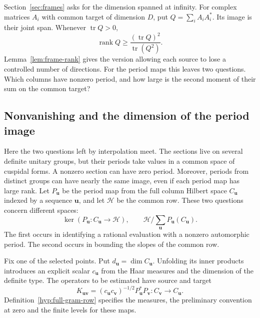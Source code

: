 Section~\ref{sec:frames} asks for the dimension spanned at infinity. For complex matrices \(A_i\) with common target of dimension \(D\), put \(Q=\sum_i A_iA_i^*\). Its image is their joint span. Whenever \(\operatorname{tr}Q>0\),
\[
                 \operatorname{rank}Q
                       \ge\frac{(\operatorname{tr}Q)^2}
                                {\operatorname{tr}(Q^2)} .
\]
Lemma~\ref{lem:frame-rank} gives the version allowing each source to lose a controlled number of directions. For the period maps this leaves two questions. Which columns have nonzero period, and how large is the second moment of their sum on the common target?

\subsection{Nonvanishing and the dimension of the period image}

Here the two questions left by interpolation meet. The sections live on several
definite unitary groups, but their periods take values in a common space of cuspidal
forms. A nonzero section can have zero period. Moreover, periods from distinct groups can have nearly the same image, even if each period map has large rank. Let \(P_{\mathbf u}\) be the period map from the full column Hilbert space \(C_{\mathbf u}\) indexed by a sequence \(\mathbf u\), and let \(\mathcal H\) be the common row. These two questions concern different spaces:
\[
             \ker(P_{\mathbf u}:C_{\mathbf u}\longrightarrow\mathcal H),\qquad
             \mathcal H\Big/\sum_{\mathbf u} P_{\mathbf u}(C_{\mathbf u}).
\]
The first occurs in identifying a rational evaluation with a nonzero automorphic period. The second occurs in bounding the slopes of the common row.

Fix one of the selected points. Put \(d_{\mathbf u}=\dim C_{\mathbf u}\). Unfolding its inner products introduces an explicit scalar \(c_{\mathbf u}\) from the Haar measures and the dimension of the definite type. The operators to be estimated have source and target
\[
 K_{\mathbf u\mathbf v}=(c_{\mathbf u}c_{\mathbf v})^{-1/2}P_{\mathbf u}^*P_{\mathbf v}:C_{\mathbf v}\longrightarrow C_{\mathbf u} .
\]
Definition~\ref{hyp:full-gram-row} specifies the measures, the preliminary convention at zero and the finite levels for these maps.


